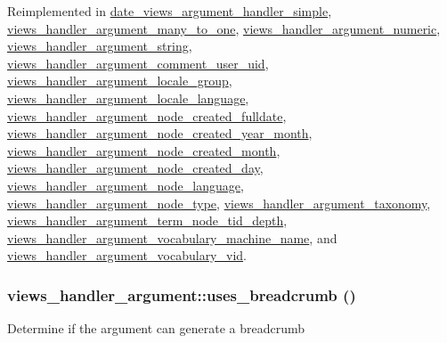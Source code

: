 Reimplemented in \hyperlink{classdate__views__argument__handler__simple_a127ac9f2d1d7a45088719cfbbfbbdf93}{date\_\-views\_\-argument\_\-handler\_\-simple}, \hyperlink{classviews__handler__argument__many__to__one_a624565fe59482f017f2f7935037d9297}{views\_\-handler\_\-argument\_\-many\_\-to\_\-one}, \hyperlink{classviews__handler__argument__numeric_a480758dbcde899b5483b091e51e2bf39}{views\_\-handler\_\-argument\_\-numeric}, \hyperlink{classviews__handler__argument__string_abd176c527d765826b51c50346309b545}{views\_\-handler\_\-argument\_\-string}, \hyperlink{classviews__handler__argument__comment__user__uid_a4e106a92bbbdb88e1207fe525480c18b}{views\_\-handler\_\-argument\_\-comment\_\-user\_\-uid}, \hyperlink{classviews__handler__argument__locale__group_a5eb8e22e84904fa604f785484befe86a}{views\_\-handler\_\-argument\_\-locale\_\-group}, \hyperlink{classviews__handler__argument__locale__language_a87bfadf6710bcc6bee4f734d258e7407}{views\_\-handler\_\-argument\_\-locale\_\-language}, \hyperlink{classviews__handler__argument__node__created__fulldate_a7e071511e9b2523b875b4ba983bbb8f2}{views\_\-handler\_\-argument\_\-node\_\-created\_\-fulldate}, \hyperlink{classviews__handler__argument__node__created__year__month_a80dd9527f548e32a8e8f9279fe0ec3d3}{views\_\-handler\_\-argument\_\-node\_\-created\_\-year\_\-month}, \hyperlink{classviews__handler__argument__node__created__month_a3dbf8aaf46f210de7c29c36abfb7a2d6}{views\_\-handler\_\-argument\_\-node\_\-created\_\-month}, \hyperlink{classviews__handler__argument__node__created__day_abf71aafe50941da8e9ad6b4e1627833a}{views\_\-handler\_\-argument\_\-node\_\-created\_\-day}, \hyperlink{classviews__handler__argument__node__language_ab880be769744ec720d0b8e2e32671daa}{views\_\-handler\_\-argument\_\-node\_\-language}, \hyperlink{classviews__handler__argument__node__type_ac17f7b9733895da68b132e6b97dcc917}{views\_\-handler\_\-argument\_\-node\_\-type}, \hyperlink{classviews__handler__argument__taxonomy_a330517e71ccc84fe85e871e05640c36d}{views\_\-handler\_\-argument\_\-taxonomy}, \hyperlink{classviews__handler__argument__term__node__tid__depth_ad5a2ca190b4b164a810f84f808faa586}{views\_\-handler\_\-argument\_\-term\_\-node\_\-tid\_\-depth}, \hyperlink{classviews__handler__argument__vocabulary__machine__name_a97cd30f6f945568766976bc99f4812ae}{views\_\-handler\_\-argument\_\-vocabulary\_\-machine\_\-name}, and \hyperlink{classviews__handler__argument__vocabulary__vid_af932cd38cbab2252261bcb077f2d9bd7}{views\_\-handler\_\-argument\_\-vocabulary\_\-vid}.\hypertarget{classviews__handler__argument_aa22155030bf440ff07a323569f80fd98}{
\subsubsection[{uses\_\-breadcrumb}]{\setlength{\rightskip}{0pt plus 5cm}views\_\-handler\_\-argument::uses\_\-breadcrumb ()}}
\label{classviews__handler__argument_aa22155030bf440ff07a323569f80fd98}
Determine if the argument can generate a breadcrumb

